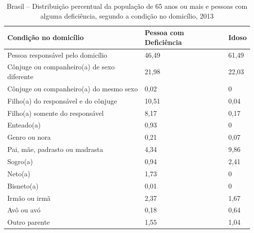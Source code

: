 \documentclass[
	12pt,				%
	openright,			%
	twoside,			%
	a4paper,			%
	english,			%
	french,				%
	spanish,			%
	brazil				%
	]{abntex2}
\begin{document}
\begin{table}[H]
	\footnotesize
	\caption{Brasil -- Distribuição percentual da população de 65 anos ou mais e pessoas com alguma deficiência, segundo a condição no domicílio, 2013}
	\label{tab_prop_byc004}
	\begin{tabular}{@{}lm{4cm}m{3cm}@{}}
		\toprule
		\textbf{Condição no domicílio}                         & \textbf{Pessoa com Deficiência} & \textbf{Idoso}  \\ \midrule
		Pessoa responsável pelo domicílio                      & 46,49                           & 61,49           \\
		Cônjuge ou companheiro(a) de sexo diferente            & 21,98                           & 22,03           \\
		Cônjuge ou companheiro(a) do mesmo sexo                & 0,02                            & 0               \\
		Filho(a) do responsável e do cônjuge                   & 10,51                           & 0,04            \\
		Filho(a) somente do responsável                        & 8,17                            & 0,17            \\
		Enteado(a)                                             & 0,93                            & 0               \\
		Genro ou nora                                          & 0,21                            & 0,07            \\
		Pai, mãe, padrasto ou madrasta                         & 4,34                            & 9,86            \\
		Sogro(a)                                               & 0,94                            & 2,41            \\
		Neto(a)                                                & 1,73                            & 0               \\
		Bisneto(a)                                             & 0,01                            & 0               \\
		Irmão ou irmã                                          & 2,37                            & 1,67            \\
		Avô ou avó                                             & 0,18                            & 0,64            \\
		Outro parente                                          & 1,55                            & 1,04            \\

\end{tabular}
\end{table}
\end{document}
